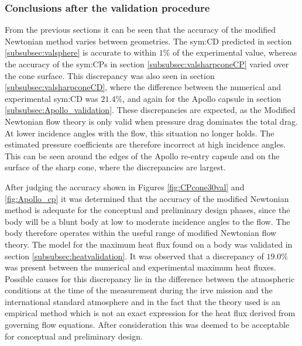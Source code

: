 \subsubsection{Conclusions after the validation procedure}
\label{subsec:validconclusions}
From the previous sections it can be seen that the accuracy of the modified Newtonian method varies between geometries. The \gls{sym:CD} predicted in section \ref{subsubsec:valsphere} is accurate to within $1\%$ of the experimental value, whereas the accuracy of the \glspl{sym:CP} in section \ref{subsubsec:valsharpconeCP} varied over the cone surface. This discrepancy was also seen in section \ref{subsubsec:valsharpconeCD}, where the difference between the numerical and experimental \gls{sym:CD} was $21.4\%$, and again for the Apollo capsule in section \ref{subsubsec:Apollo_validation}. These discrepancies are expected, as the Modified Newtonian flow theory is only valid when pressure drag dominates the total drag. At lower incidence angles with the flow, this situation no longer holds. The estimated pressure coefficients are therefore incorrect at high incidence angles. This can be seen around the edges of the Apollo re-entry capsule and on the surface of the sharp cone, where the discrepancies are largest.  

After judging the accuracy shown in Figures \ref{fig:CPcone30val} and \ref{fig:Apollo_cp} it was determined that the accuracy of the modified Newtonian method is adequate for the conceptual and preliminary design phases, since the body will be a blunt body at low to moderate incidence angles to the flow. The body therefore operates within the useful range of modified Newtonian flow theory. 
The model for the maximum heat flux found on a body was validated in section \ref{subsubsec:heatvalidation}. It was observed that a discrepancy of $19.0\%$ was present between the numerical and experimental maximum heat fluxes. Possible causes for this discrepancy lie in the difference between the atmospheric conditions at the time of the measurement during the \gls{irve} mission and the international standard atmosphere and in the fact that the theory used is an empirical method which is not an exact expression for the heat flux derived from governing flow equations.  After consideration this was deemed to be acceptable for conceptual and preliminary design.